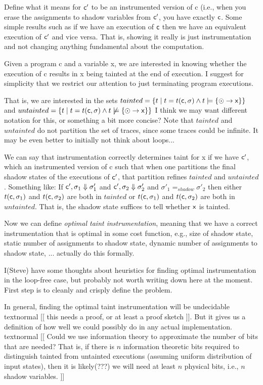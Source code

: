 \documentclass[]{article}
\newcommand{\todo}[1]{textnormal{{\color{black} [[ #1 ]]}}}
\begin{document}
Define what it means for ${\sf c}'$ to be an instrumented version of {\sf c} (i.e.,
when you erase the assignments to shadow variables from ${\sf c}'$,
you have exactly ${\sf c}$. Some simple results such as if we have an
execution of ${\sf c}$ then we have an equivalent execution of ${\sf
  c}'$ and vice versa. That is, showing it really is just
instrumentation and not changing anything fundamental about the computation.

Given a program {\sf c} and a variable {\sf x}, we are interested in
knowing whether the execution of {\sf c} results in {\sf x} being
tainted at the end of execution. I suggest for simplicity that
  we restrict our attention to just terminating program executions.

That is, we are interested in the sets $tainted = \{ t \mid t =
t({\sf c},\sigma) \land t \models \{ \odot \rightarrow {\sf x} \} \}$ and
$untainted = \{ t \mid
t = t({\sf c},\sigma) \land t \not\models \{ \odot \rightarrow {\sf x} \} \}$
I think we may want different notation for this, or something a bit more
concise?
Note that $tainted$ and $untainted$ do not partition the set of
traces, since some traces could be infinite. It may be even better to initially not think about loops...

We can say that instrumentation correctly determines taint for {\sf x}
if we have ${\sf c}'$, which an instrumented version of {\sf c} such
that when one partitions the final shadow states of the executions of
${\sf c}'$, that partition refines $tainted$ and
$untainted$. Something like:
If ${\sf c}', \sigma_1 \Downarrow \sigma'_1$ and ${\sf c}', \sigma_2
\Downarrow \sigma'_2$ and $\sigma'_1 =_\mathit{shadow} \sigma'_2$ then
either $t({\sf c},\sigma_1)$ and $t({\sf c},\sigma_2)$ are both in $tainted$ or 
$t({\sf c},\sigma_1)$ and $t({\sf c},\sigma_2)$ are both in $untainted$. That is, the shadow
state suffices to tell whether $\sf x$ is tainted.

Now we can define \emph{optimal taint instrumentation}, meaning that
we have a correct instrumentation that is optimal in some cost
function, e.g., size of shadow state, static number of assignments to
shadow state, dynamic number of assignments to shadow state,
... actually do this formally.

I(Steve) have some thoughts about heuristics for finding optimal
instrumentation in the loop-free case, but probably not worth writing
down here at the moment. First step is to cleanly and crisply define
the problem.

In general, finding the optimal taint instrumentation will be
undecidable \todo{this needs a proof, or at least a proof sketch}. But
it gives us a definition of how well we could possibly do in any
actual implementation. \todo{Could we use information theory to
  approximate the number of bits that are needed? That is, if there is
$n$ information theoretic bits required to distinguish tainted from
untainted executions (assuming uniform distribution of input states), then it is likely(???) we will need at least $n$ physical bits, i.e., $n$
shadow variables.}
\end{document}
